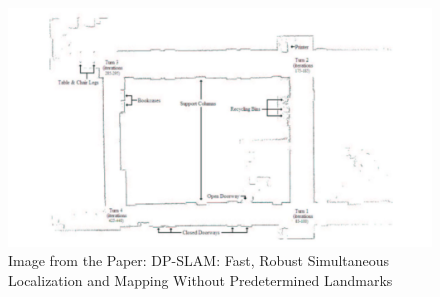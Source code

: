 \documentclass{article}
\begin{document}
\begin{figure}[hb]
    \centering
    \includegraphics[width=1\textwidth]{Images/Paper68Figure.jpg}
    \caption{Image from the Paper: DP-SLAM: Fast, Robust Simultaneous Localization and Mapping Without Predetermined Landmarks}
\end{figure}
\end{document}
